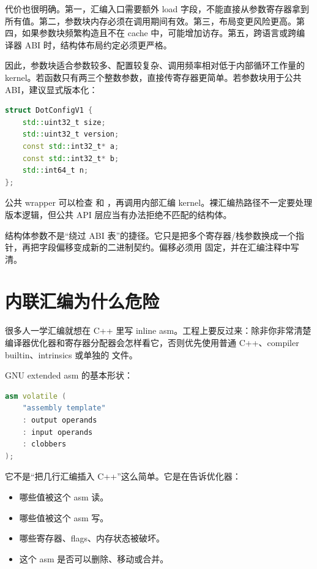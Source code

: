 代价也很明确。第一，汇编入口需要额外 load 字段，不能直接从参数寄存器拿到所有值。第二，参数块内存必须在调用期间有效。第三，布局变更风险更高。第四，如果参数块频繁构造且不在 cache 中，可能增加访存。第五，跨语言或跨编译器 ABI 时，结构体布局约定必须更严格。

因此，参数块适合参数较多、配置较复杂、调用频率相对低于内部循环工作量的 kernel。若函数只有两三个整数参数，直接传寄存器更简单。若参数块用于公共 ABI，建议显式版本化：

\begin{lstlisting}[language=C++]
struct DotConfigV1 {
    std::uint32_t size;
    std::uint32_t version;
    const std::int32_t* a;
    const std::int32_t* b;
    std::int64_t n;
};
\end{lstlisting}

公共 wrapper 可以检查  和 ，再调用内部汇编 kernel。裸汇编热路径不一定要处理版本逻辑，但公共 API 层应当有办法拒绝不匹配的结构体。

\begin{warningbox}
结构体参数不是“绕过 ABI 表”的捷径。它只是把多个寄存器/栈参数换成一个指针，再把字段偏移变成新的二进制契约。偏移必须用  固定，并在汇编注释中写清。
\end{warningbox}

\section{内联汇编为什么危险}

很多人一学汇编就想在 C++ 里写 inline asm。工程上要反过来：除非你非常清楚编译器优化器和寄存器分配器会怎样看它，否则优先使用普通 C++、compiler builtin、intrinsics 或单独的  文件。

GNU extended asm 的基本形状：

\begin{lstlisting}[language=C++]
asm volatile (
    "assembly template"
    : output operands
    : input operands
    : clobbers
);
\end{lstlisting}

它不是“把几行汇编插入 C++”这么简单。它是在告诉优化器：

\begin{itemize}
  \item 哪些值被这个 asm 读。
  \item 哪些值被这个 asm 写。
  \item 哪些寄存器、flags、内存状态被破坏。
  \item 这个 asm 是否可以删除、移动或合并。
\end{itemize}

